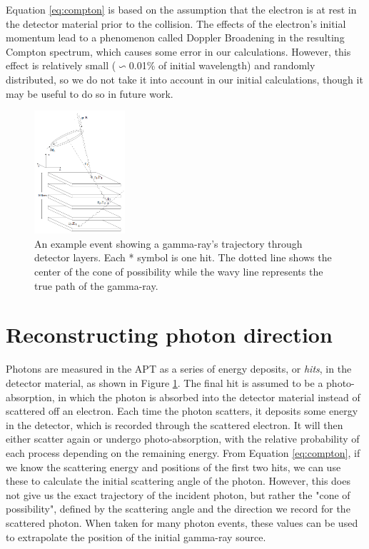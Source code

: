 Equation \ref{eq:compton} is based on the assumption that the electron is at rest in the detector material prior to the collision. The effects of the electron's initial momentum lead to a phenomenon called Doppler Broadening in the resulting Compton spectrum, which causes some error in our calculations. However, this effect is relatively small ($\backsim$0.01\% of initial wavelength) and randomly distributed, so we do not take it into account in our initial calculations, though it may be useful to do so in future work.


\begin{figure}
    \centering
    \includegraphics[width=0.3\textwidth]{detector_scattering.PNG}
    \caption{An example event showing a gamma-ray's trajectory through detector layers. Each * symbol is one hit. The dotted line shows the center of the cone of possibility while the wavy line represents the true path of the gamma-ray. \cite{comptonThesis}}
    \label{fig:scatters}
\end{figure}

\section{Reconstructing photon direction}

Photons are measured in the APT as a series of energy deposits, or \emph{hits}, in the detector material, as shown in Figure \ref{fig:scatters}. The final hit is assumed to be a photo-absorption, in which the photon is absorbed into the detector material instead of scattered off an electron. Each time the photon scatters, it deposits some energy in the detector, which is recorded through the scattered electron. It will then either scatter again or undergo photo-absorption, with the relative probability of each process depending on the remaining energy. From Equation \ref{eq:compton}, if we know the scattering energy and positions of the first two hits, we can use these to calculate the initial scattering angle of the photon. However, this does not give us the exact trajectory of the incident photon, but rather the "cone of possibility", defined by the scattering angle and the direction we record for the scattered photon. When taken for many photon events, these values can be used to extrapolate the position of the initial gamma-ray source.

